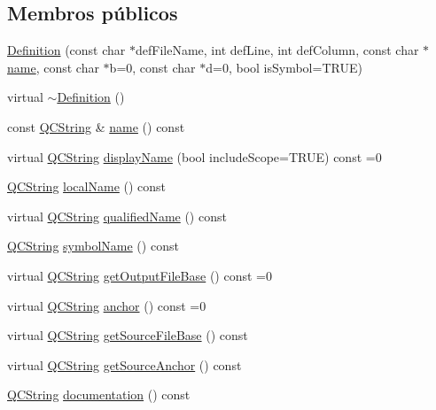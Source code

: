 \subsection*{Membros públicos}
\begin{DoxyCompactItemize}
\item 
\hyperlink{class_definition_a3c3736c3c9b1ba3dae3799258cddd27c}{Definition} (const char $\ast$def\-File\-Name, int def\-Line, int def\-Column, const char $\ast$\hyperlink{class_definition_a2c310e06c9aadc6fb218f80fcbb5c695}{name}, const char $\ast$b=0, const char $\ast$d=0, bool is\-Symbol=T\-R\-U\-E)
\item 
virtual \hyperlink{class_definition_af8b3205a2cff0e941e6b026e81440ec6}{$\sim$\-Definition} ()
\item 
const \hyperlink{class_q_c_string}{Q\-C\-String} \& \hyperlink{class_definition_a2c310e06c9aadc6fb218f80fcbb5c695}{name} () const 
\item 
virtual \hyperlink{class_q_c_string}{Q\-C\-String} \hyperlink{class_definition_a98f292cf0fb9a6a1314c7a159b7166ec}{display\-Name} (bool include\-Scope=T\-R\-U\-E) const =0
\item 
\hyperlink{class_q_c_string}{Q\-C\-String} \hyperlink{class_definition_a85adac6c21b9f8e8f374c9b915f875ee}{local\-Name} () const 
\item 
virtual \hyperlink{class_q_c_string}{Q\-C\-String} \hyperlink{class_definition_ab8b1c377b3cff112fdca997c37007944}{qualified\-Name} () const 
\item 
\hyperlink{class_q_c_string}{Q\-C\-String} \hyperlink{class_definition_a2abf0816f6db6ed419d97a01d1242f1a}{symbol\-Name} () const 
\item 
virtual \hyperlink{class_q_c_string}{Q\-C\-String} \hyperlink{class_definition_a9d86cf13f2c63846c41ef739e4cdadf6}{get\-Output\-File\-Base} () const =0
\item 
virtual \hyperlink{class_q_c_string}{Q\-C\-String} \hyperlink{class_definition_aeefc9f68d99e616f91c43a3cebf96357}{anchor} () const =0
\item 
virtual \hyperlink{class_q_c_string}{Q\-C\-String} \hyperlink{class_definition_a0b24a407e5cd41328e5c64aac0884b6f}{get\-Source\-File\-Base} () const 
\item 
virtual \hyperlink{class_q_c_string}{Q\-C\-String} \hyperlink{class_definition_a32dc5ecc852dac51949439819e97cc24}{get\-Source\-Anchor} () const 
\item 
\hyperlink{class_q_c_string}{Q\-C\-String} \hyperlink{class_definition_a093581bd7e1c230cb0c851b46798592d}{documentation} () const 

\end{DoxyCompactItemize}
